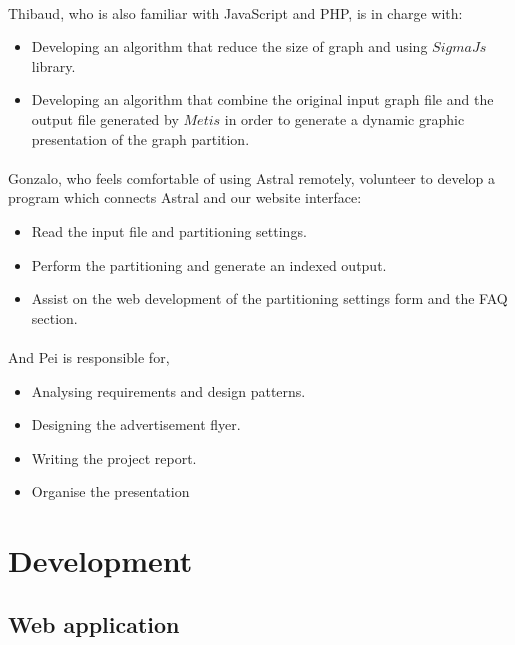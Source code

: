 \documentclass{cranfieldChart}
\begin{document}
\paragraph{}
Thibaud, who is also familiar with JavaScript and PHP, is in charge with: 
\begin{itemize}
    \item Developing an algorithm that reduce the size of graph and using $SigmaJs$ library.
    \item Developing an algorithm that combine the original input graph file and the output file generated by $Metis$ in order to generate a dynamic graphic presentation of the graph partition. 
\end{itemize}

\paragraph{}
Gonzalo, who feels comfortable of using Astral remotely, volunteer to develop a program which connects Astral and our website interface:
\begin{itemize}
    \item Read the input file and partitioning settings.
    \item Perform the partitioning and generate an indexed output.
    \item Assist on the web development of the partitioning settings form and the FAQ section.
\end{itemize}

\paragraph{}
And Pei is responsible for, 
\begin{itemize}
    \item Analysing requirements and design patterns. 
    \item Designing the advertisement flyer.
    \item Writing  the project report.
    \item Organise the presentation 
\end{itemize}

\section{Development}

\subsection{Web application}
\end{document}
